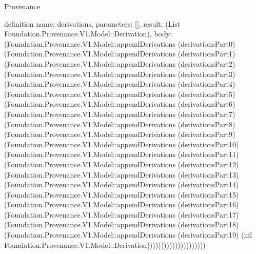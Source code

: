 \begin{lexlean}{Provenance}
\begin{semanticmodule}
definition{
  name: derivations,
  parameters: [],
  result: (List Foundation.Provenance.V1.Model::Derivation),
  body: (Foundation.Provenance.V1.Model::appendDerivations (derivationsPart0) (Foundation.Provenance.V1.Model::appendDerivations (derivationsPart1) (Foundation.Provenance.V1.Model::appendDerivations (derivationsPart2) (Foundation.Provenance.V1.Model::appendDerivations (derivationsPart3) (Foundation.Provenance.V1.Model::appendDerivations (derivationsPart4) (Foundation.Provenance.V1.Model::appendDerivations (derivationsPart5) (Foundation.Provenance.V1.Model::appendDerivations (derivationsPart6) (Foundation.Provenance.V1.Model::appendDerivations (derivationsPart7) (Foundation.Provenance.V1.Model::appendDerivations (derivationsPart8) (Foundation.Provenance.V1.Model::appendDerivations (derivationsPart9) (Foundation.Provenance.V1.Model::appendDerivations (derivationsPart10) (Foundation.Provenance.V1.Model::appendDerivations (derivationsPart11) (Foundation.Provenance.V1.Model::appendDerivations (derivationsPart12) (Foundation.Provenance.V1.Model::appendDerivations (derivationsPart13) (Foundation.Provenance.V1.Model::appendDerivations (derivationsPart14) (Foundation.Provenance.V1.Model::appendDerivations (derivationsPart15) (Foundation.Provenance.V1.Model::appendDerivations (derivationsPart16) (Foundation.Provenance.V1.Model::appendDerivations (derivationsPart17) (Foundation.Provenance.V1.Model::appendDerivations (derivationsPart18) (Foundation.Provenance.V1.Model::appendDerivations (derivationsPart19) (nil Foundation.Provenance.V1.Model::Derivation)))))))))))))))))))))
}


\end{semanticmodule}
\end{lexlean}
